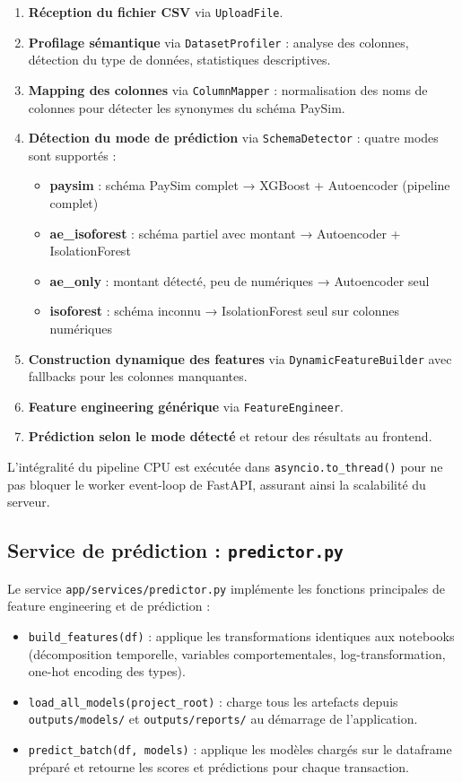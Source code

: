 \documentclass[12pt,a4paper,twoside]{report}
\begin{document}
\begin{enumerate}
  \item \textbf{Réception du fichier CSV} via \texttt{UploadFile}.
  \item \textbf{Profilage sémantique} via \texttt{DatasetProfiler} : analyse des colonnes, détection du type de données, statistiques descriptives.
  \item \textbf{Mapping des colonnes} via \texttt{ColumnMapper} : normalisation des noms de colonnes pour détecter les synonymes du schéma PaySim.
  \item \textbf{Détection du mode de prédiction} via \texttt{SchemaDetector} : quatre modes sont supportés :
  \begin{itemize}
    \item \textbf{paysim} : schéma PaySim complet → XGBoost + Autoencoder (pipeline complet)
    \item \textbf{ae\_isoforest} : schéma partiel avec montant → Autoencoder + IsolationForest
    \item \textbf{ae\_only} : montant détecté, peu de numériques → Autoencoder seul
    \item \textbf{isoforest} : schéma inconnu → IsolationForest seul sur colonnes numériques
  \end{itemize}
  \item \textbf{Construction dynamique des features} via \texttt{DynamicFeatureBuilder} avec fallbacks pour les colonnes manquantes.
  \item \textbf{Feature engineering générique} via \texttt{FeatureEngineer}.
  \item \textbf{Prédiction selon le mode détecté} et retour des résultats au frontend.
\end{enumerate}

L'intégralité du pipeline CPU est exécutée dans \texttt{asyncio.to\_thread()} pour ne pas bloquer le worker event-loop de FastAPI, assurant ainsi la scalabilité du serveur.

\subsection{Service de prédiction : \texttt{predictor.py}}

Le service \texttt{app/services/predictor.py} implémente les fonctions principales de feature engineering et de prédiction :

\begin{itemize}
  \item \texttt{build\_features(df)} : applique les transformations identiques aux notebooks (décomposition temporelle, variables comportementales, log-transformation, one-hot encoding des types).
  \item \texttt{load\_all\_models(project\_root)} : charge tous les artefacts depuis \texttt{outputs/models/} et \texttt{outputs/reports/} au démarrage de l'application.
  \item \texttt{predict\_batch(df, models)} : applique les modèles chargés sur le dataframe préparé et retourne les scores et prédictions pour chaque transaction.
\end{itemize}
\end{document}
